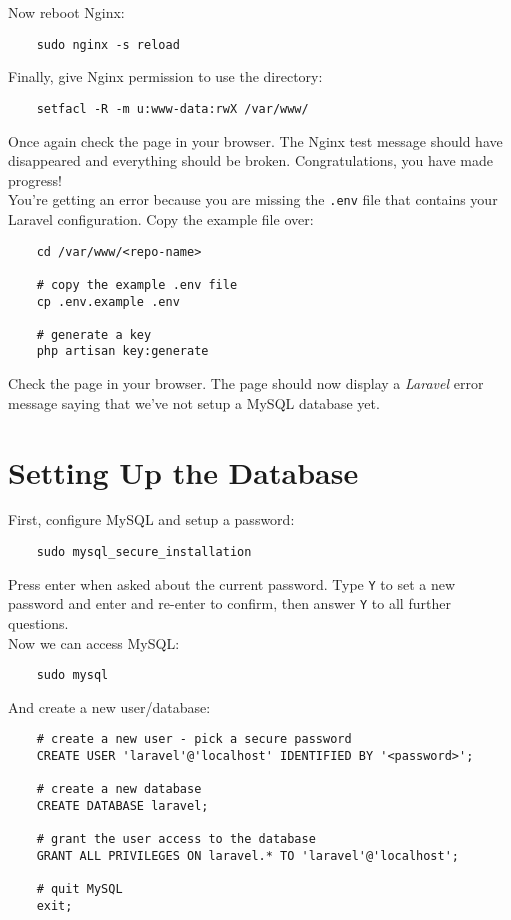 Now reboot Nginx:

\begin{verbatim}
    sudo nginx -s reload
\end{verbatim}

Finally, give Nginx permission to use the directory:

\begin{verbatim}
    setfacl -R -m u:www-data:rwX /var/www/
\end{verbatim}

Once again check the page in your browser. The Nginx test message should have disappeared and everything should be broken. Congratulations, you have made progress!
\\

You're getting an error because you are missing the \texttt{.env} file that contains your Laravel configuration. Copy the example file over:

\begin{verbatim}
    cd /var/www/<repo-name>

    # copy the example .env file
    cp .env.example .env

    # generate a key
    php artisan key:generate
\end{verbatim}

Check the page in your browser. The page should now display a \textit{Laravel} error message saying that we've not setup a MySQL database yet.


\section{Setting Up the Database}

First, configure MySQL and setup a password:

\begin{verbatim}
    sudo mysql_secure_installation
\end{verbatim}

Press enter when asked about the current password. Type \texttt{Y} to set a new password and enter and re-enter to confirm, then answer \texttt{Y} to all further questions.
\\

Now we can access MySQL:

\begin{verbatim}
    sudo mysql
\end{verbatim}

And create a new user/database:

\begin{verbatim}
    # create a new user - pick a secure password
    CREATE USER 'laravel'@'localhost' IDENTIFIED BY '<password>';

    # create a new database
    CREATE DATABASE laravel;

    # grant the user access to the database
    GRANT ALL PRIVILEGES ON laravel.* TO 'laravel'@'localhost';

    # quit MySQL
    exit;
\end{verbatim}

